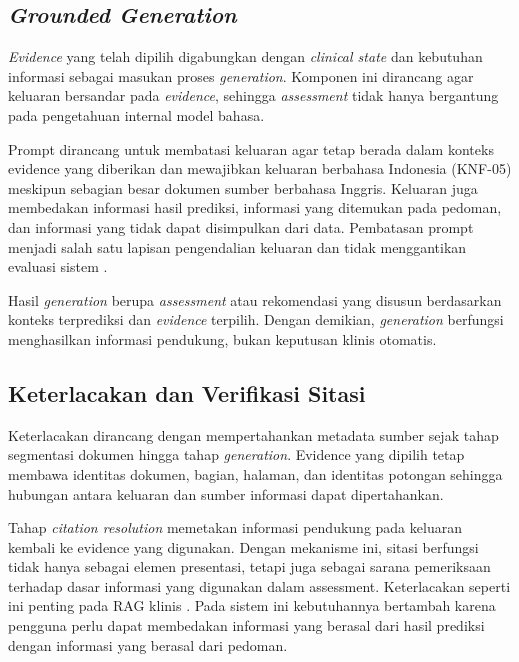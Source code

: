 \subsection{\textit{Grounded Generation}} 
\label{subsec:bab4-grounded-generation}

\textit{Evidence} yang telah dipilih digabungkan dengan \textit{clinical state} dan kebutuhan informasi sebagai masukan proses \textit{generation}. Komponen ini dirancang
agar keluaran bersandar pada \textit{evidence}, sehingga \textit{assessment} tidak hanya bergantung pada pengetahuan internal model bahasa.

Prompt dirancang untuk membatasi keluaran agar tetap berada dalam konteks evidence yang diberikan dan mewajibkan keluaran berbahasa Indonesia (KNF-05) meskipun
sebagian besar dokumen sumber berbahasa Inggris. Keluaran juga membedakan informasi hasil prediksi, informasi yang ditemukan pada pedoman, dan informasi yang tidak
dapat disimpulkan dari data. Pembatasan prompt menjadi salah satu lapisan pengendalian keluaran dan tidak menggantikan evaluasi sistem
\parencite{lewis2020,gao2023}.

Hasil \textit{generation} berupa \textit{assessment} atau rekomendasi yang disusun berdasarkan konteks terprediksi dan \textit{evidence} terpilih. Dengan demikian,
\textit{generation} berfungsi menghasilkan informasi pendukung, bukan keputusan klinis otomatis.

\subsection{Keterlacakan dan Verifikasi Sitasi} 
\label{subsec:bab4-keterlacakan-verifikasi-sitasi}

Keterlacakan dirancang dengan mempertahankan metadata sumber sejak tahap segmentasi dokumen hingga tahap \textit{generation}. Evidence yang dipilih tetap membawa identitas dokumen, bagian,
halaman, dan identitas potongan sehingga hubungan antara keluaran dan sumber informasi dapat dipertahankan.

Tahap \textit{citation resolution} memetakan informasi pendukung pada keluaran kembali ke evidence yang digunakan. Dengan mekanisme ini, sitasi berfungsi tidak hanya sebagai elemen
presentasi, tetapi juga sebagai sarana pemeriksaan terhadap dasar informasi yang digunakan dalam assessment. Keterlacakan seperti ini penting pada RAG klinis \parencite{kresevic2024,lee2024,wang2024}.
Pada sistem ini kebutuhannya bertambah karena pengguna perlu dapat membedakan informasi yang berasal dari hasil prediksi dengan informasi yang berasal dari pedoman.

